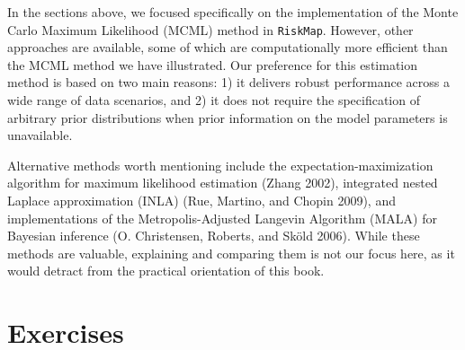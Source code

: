\documentclass[
  letterpaper,
]{krantz}
\begin{document}
In the sections above, we focused specifically on the implementation of
the Monte Carlo Maximum Likelihood (MCML) method in \texttt{RiskMap}.
However, other approaches are available, some of which are
computationally more efficient than the MCML method we have illustrated.
Our preference for this estimation method is based on two main reasons:
1) it delivers robust performance across a wide range of data scenarios,
and 2) it does not require the specification of arbitrary prior
distributions when prior information on the model parameters is
unavailable.

Alternative methods worth mentioning include the
expectation-maximization algorithm for maximum likelihood estimation
(Zhang 2002), integrated nested Laplace approximation (INLA) (Rue,
Martino, and Chopin 2009), and implementations of the
Metropolis-Adjusted Langevin Algorithm (MALA) for Bayesian inference (O.
Christensen, Roberts, and Sköld 2006). While these methods are valuable,
explaining and comparing them is not our focus here, as it would detract
from the practical orientation of this book.

\hypertarget{exercises}{%
\section{Exercises}\label{exercises}}
\end{document}
